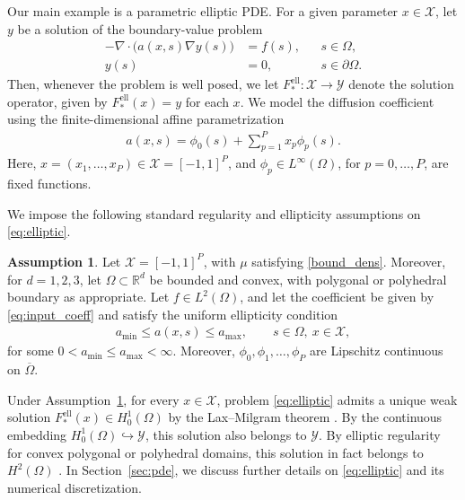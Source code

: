 \documentclass[11pt]{article}
\numberwithin{equation}{section}
\theoremstyle{plain}
\theoremstyle{definition}
\newtheorem{assumption}[theorem]{Assumption}
\theoremstyle{remark}
\begin{document}
Our main example is a parametric elliptic PDE. For a given parameter
$x\in\mathcal{X}$, let $y$ be a solution of the boundary-value problem
\begin{equation}\label{eq:elliptic}
\begin{aligned}
-\nabla\cdot\bigl(a(x,s)\nabla y(s)\bigr) &= f(s),
&& s\in\Omega,\\
y(s)&=0,
&& s\in\partial\Omega.
\end{aligned}
\end{equation}
Then, whenever the problem is well posed, we let
$F_*^{\mathrm{ell}}\colon\mathcal{X}\to\mathcal{Y}$ denote the solution
operator, given by $F_*^{\mathrm{ell}}(x)=y$ for each $x$.
We model the diffusion coefficient using the finite-dimensional affine
parametrization
\begin{align} \label{eq:input_coeff}
a(x,s)=\phi_0(s)+\sum_{p=1}^P x_p\phi_p(s).
\end{align}
Here, $x=(x_1,\ldots,x_P)\in\mathcal{X}=[-1,1]^P$, and
$\phi_p\in L^\infty(\Omega)$, for $p=0,\ldots,P$, are fixed functions.

We impose the following standard regularity and ellipticity assumptions on
\eqref{eq:elliptic}.

\begin{assumption} \label{as:pde}
Let $\mathcal{X}=[-1,1]^P$, with $\mu$ satisfying
\eqref{bound_dens}. Moreover, for $d=1,2,3$, let
$\Omega\subset\mathbb{R}^d$ be bounded and convex, with polygonal or
polyhedral boundary as appropriate. Let $f\in L^2(\Omega)$, and let the
coefficient be given by \eqref{eq:input_coeff} and satisfy the uniform
ellipticity condition
\begin{align} \label{def:unif_ell}
a_{\mathrm{min}}\leq a(x,s)\leq a_{\mathrm{max}},
\qquad s\in\Omega,\ x\in\mathcal{X},
\end{align}
for some $0<a_{\mathrm{min}}\leq a_{\mathrm{max}}<\infty$. Moreover,
$\phi_0,\phi_1,\ldots,\phi_P$ are Lipschitz continuous on $\overline{\Omega}$.
\end{assumption}

Under Assumption~\ref{as:pde}, for every $x\in\mathcal{X}$, problem
\eqref{eq:elliptic} admits a unique weak solution
$F_*^{\mathrm{ell}}(x)\in H_0^1(\Omega)$ by the Lax--Milgram theorem
\cite{evans2022partial}. By the continuous embedding
$H_0^1(\Omega)\hookrightarrow\mathcal{Y}$, this solution also belongs to
$\mathcal{Y}$. By elliptic regularity for convex polygonal or polyhedral
domains, this solution in fact belongs to $H^2(\Omega)$
\cite{grisvard2011elliptic}. In Section~\ref{sec:pde}, we discuss further
details on \eqref{eq:elliptic} and its numerical discretization.
\end{document}
